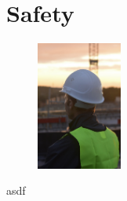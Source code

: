 \section{Safety}\label{sec:safety}

\begin{figure}
    \centering
    \includegraphics[width=0.25\textwidth]{images/safety}
\end{figure}

asdf
